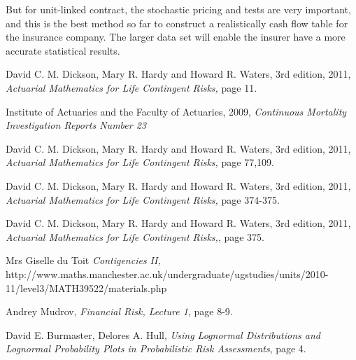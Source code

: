 \documentclass{report}
\begin{document}
But for unit-linked contract, the stochastic pricing and tests are very important, and this is the best method so far to construct a realistically cash flow table for the insurance company. The larger data set will enable the insurer have a more accurate statistical results.











\begin{thebibliography}{99}             %

  David C. M. Dickson, Mary R. Hardy and Howard R. Waters,
    3rd edition, 2011, 
    {\em Actuarial Mathematics for Life Contingent Risks,}
    page 11.


 Institute of Actuaries and the Faculty of Actuaries,
2009,
{\em Continuous Mortality Investigation Reports Number 23}


  David C. M. Dickson, Mary R. Hardy and Howard R. Waters,
    3rd edition, 2011, 
    {\em Actuarial Mathematics for Life Contingent Risks,}
    page 77,109.



  David C. M. Dickson, Mary R. Hardy and Howard R. Waters,
    3rd edition, 2011, 
    {\em Actuarial Mathematics for Life Contingent Risks,}
    page 374-375.

  David C. M. Dickson, Mary R. Hardy and Howard R. Waters,
    3rd edition, 2011, 
    {\em Actuarial Mathematics for Life Contingent Risks,},
    page 375.



  Mrs Giselle du Toit
    {\em Contigencies II,}
    http://www.maths.manchester.ac.uk/undergraduate/ugstudies/units/2010-11/level3/MATH39522/materials.php



  Andrey Mudrov,
    {\em Financial Risk, Lecture 1},
    page 8-9.



  David E. Burmaster, Delores A. Hull,
    {\em Using Lognormal Distributions and Lognormal Probability Plots in Probabilistic Risk Assessments},
    page 4.





\end{thebibliography}
\end{document}
